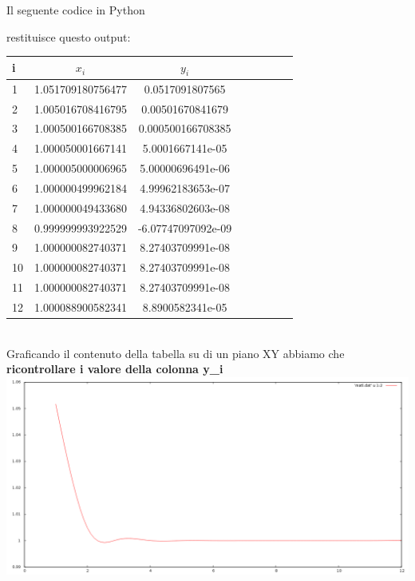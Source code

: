 Il seguente codice in Python


restituisce questo output:

\begin{tabular}{l*{6}{c}r}
i & \( x_i \) & \( y_i \)  \\
\hline
1 & 1.051709180756477  &  0.0517091807565 \\
2 & 1.005016708416795  &  0.00501670841679 \\
3 & 1.000500166708385  &  0.000500166708385 \\
4 & 1.000050001667141  &  5.0001667141e-05 \\
5 & 1.000005000006965  &  5.00000696491e-06 \\
6 & 1.000000499962184  &  4.99962183653e-07 \\
7 & 1.000000049433680  &  4.94336802603e-08 \\
8 & 0.999999993922529  &  -6.07747097092e-09 \\
9 & 1.000000082740371  &  8.27403709991e-08 \\
10 & 1.000000082740371  &  8.27403709991e-08 \\
11 & 1.000000082740371  &  8.27403709991e-08 \\
12 & 1.000088900582341  &  8.8900582341e-05 \\

\end{tabular} \\

Graficando il contenuto della tabella su di un piano XY abbiamo che \\

\textbf{ricontrollare i valore della colonna y_i}\\

\includegraphics[scale=0.4]{cap_1/es4/matlab.png}
